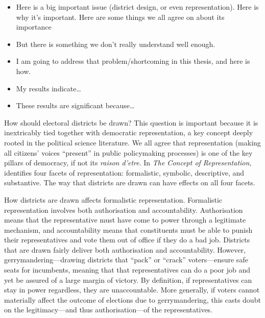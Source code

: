 \documentclass[]{article}
\providecommand{\tightlist}{%
  \setlength{\itemsep}{0pt}\setlength{\parskip}{0pt}}
\begin{document}
\begin{itemize}
\tightlist
\item
  Here is a big important issue (district design, or even
  representation). Here is why it's important. Here are some things we
  all agree on about its importance
\item
  But there is something we don't really understand well enough.
\item
  I am going to address that problem/shortcoming in this thesis, and
  here is how.
\item
  My results indicate\ldots{}
\item
  These results are significant because\ldots{}
\end{itemize}

How should electoral districts be drawn? This question is important
because it is inextricably tied together with democratic representation,
a key concept deeply rooted in the political science literature. We all
agree that representation (making all citizens' voices ``present'' in
public policymaking processes) is one of the key pillars of democracy,
if not its \emph{raison d'etre}. In \emph{The Concept of
Representation}, \cite{pitkin} identifies four facets of representation:
formalistic, symbolic, descriptive, and substantive. The way that
districts are drawn can have effects on all four facets.

How districts are drawn affects formalistic representation. Formalistic
representation involves both authorisation and accountability.
Authorisation means that the representative must have come to power
through a legitimate mechanism, and accountability means that
constituents must be able to punish their representatives and vote them
out of office if they do a bad job. Districts that are drawn fairly
deliver both authorisation and accountability. However,
gerrymandering---drawing districts that ``pack'' or ``crack''
voters---ensure safe seats for incumbents, meaning that that
representatives can do a poor job and yet be assured of a large margin
of victory. By definition, if representatives can stay in power
regardless, they are unaccountable. More generally, if voters cannot
materially affect the outcome of elections due to gerrymandering, this
casts doubt on the legitimacy---and thus authorisation---of the
representatives.
\end{document}
